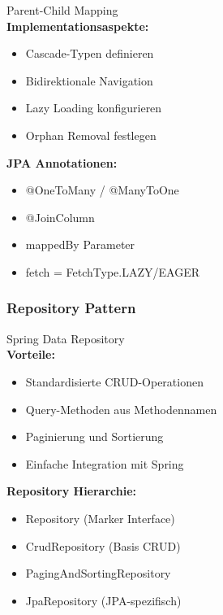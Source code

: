 \begin{concept}{Parent-Child Mapping}\\
\textbf{Implementationsaspekte:}
\begin{itemize}
    \item Cascade-Typen definieren
    \item Bidirektionale Navigation
    \item Lazy Loading konfigurieren
    \item Orphan Removal festlegen
\end{itemize}

\textbf{JPA Annotationen:}
\begin{itemize}
    \item @OneToMany / @ManyToOne
    \item @JoinColumn
    \item mappedBy Parameter
    \item fetch = FetchType.LAZY/EAGER
\end{itemize}
\end{concept}

\subsubsection{Repository Pattern}

\begin{concept}{Spring Data Repository}\\
\textbf{Vorteile:}
\begin{itemize}
    \item Standardisierte CRUD-Operationen
    \item Query-Methoden aus Methodennamen
    \item Paginierung und Sortierung
    \item Einfache Integration mit Spring
\end{itemize}

\textbf{Repository Hierarchie:}
\begin{itemize}
    \item Repository (Marker Interface)
    \item CrudRepository (Basis CRUD)
    \item PagingAndSortingRepository
    \item JpaRepository (JPA-spezifisch)
\end{itemize}
\end{concept}

